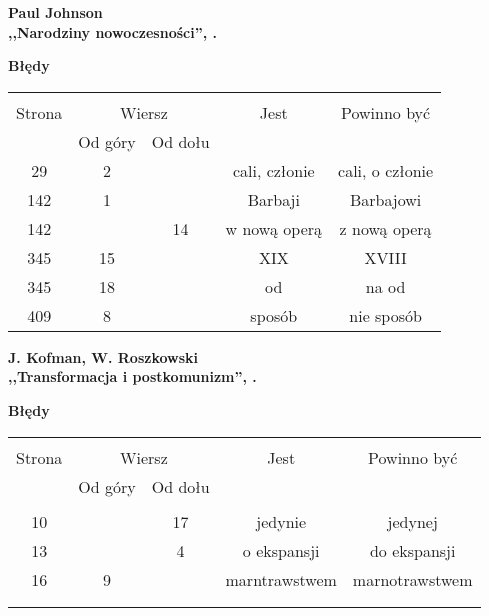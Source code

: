 \documentclass[a4paper,11pt]{article}
\newcommand{\spaceOne}{2em}
\newcommand{\tb}{\textbf}
\newcommand{\Center}[1]{\begin{center} #1 \end{center}}
\newcommand{\CenterTB}[1]{\Center{\tb{#1}}}
\newcommand{\Work}[1]{ \begin{center} {\large \tb{#1}} \end{center} }
\begin{document}
\vspace{\spaceOne}



\Work{
  Paul Johnson \\
  ,,Narodziny nowoczesności'', \cite{Joh95}.}


\CenterTB{Błędy}
\begin{center}
  \begin{tabular}{|c|c|c|c|c|}
    \hline
    & \multicolumn{2}{c|}{} & & \\
    Strona & \multicolumn{2}{c|}{Wiersz}& Jest & Powinno być \\ \cline{2-3}
    & Od góry & Od dołu &  &  \\ \hline
    29 & 2 & & cali, członie & cali, o członie \\
    142 & 1 & & Barbaji & Barbajowi \\
    142 & & 14 & w nową operą & z nową operą \\
    345 & 15 & & XIX & XVIII \\
    345 & 18 & & od & na od \\
    409 & 8 & & sposób & nie sposób \\ \hline
  \end{tabular}
\end{center}

\vspace{\spaceOne}




\Work{
  J. Kofman, W. Roszkowski \\
  ,,Transformacja i postkomunizm'', \cite{KR99}.}


\CenterTB{Błędy}

\begin{center}
  \begin{tabular}{|c|c|c|c|c|}
    \hline
    & \multicolumn{2}{c|}{} & & \\
    Strona & \multicolumn{2}{c|}{Wiersz}& Jest & Powinno być \\ \cline{2-3}
    & Od góry & Od dołu &  &  \\ \hline
    & & & & \\
    10 & & 17 & jedynie & jedynej \\
    13 & & 4 & o ekspansji & do ekspansji \\
    16 & 9 & & marntrawstwem & marnotrawstwem \\
    & & & & \\
    & & & &  \\ \hline
  \end{tabular}
\end{center}
\end{document}
